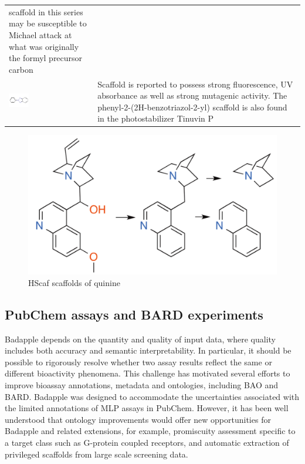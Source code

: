 \begin{table}
\begin{tabular}{p{0.3\linewidth}p{0.7\linewidth}}
scaffold in this series may be susceptible to Michael attack at what was originally the formyl precursor carbon\\
\includegraphics[align=t,width=0.25\textwidth]{data/badapple/medchem_05.png} & Scaffold is reported to possess strong fluorescence, UV absorbance as well as strong mutagenic activity\cite{Oda2008-at}. The phenyl-2-(2H-benzotriazol-2-yl) scaffold is also found in the photostabilizer Tinuvin P\\
\hline
\end{tabular}
\label{table:ba_cmp_medchem}
\end{table}

\begin{figure}
	\includegraphics[width=\textwidth]{figures/badapple/Badapple_Fig5.png}
	\caption{HScaf scaffolds of quinine}
	\label{fig:BA_05}
\end{figure}

\subsection{PubChem assays and BARD experiments}

Badapple depends on the quantity and quality of input data, where quality includes both accuracy and semantic interpretability. In particular, it should be possible to rigorously resolve whether two assay results reflect the same or different bioactivity phenomena. This challenge has motivated several efforts to improve bioassay annotations, metadata and ontologies, including BAO and BARD. Badapple was designed to accommodate the uncertainties associated with the limited annotations of MLP assays in PubChem. However, it has been well understood that ontology improvements would offer new opportunities for Badapple and related extensions, for example, promiscuity assessment specific to a target class such as G-protein coupled receptors, and automatic extraction of privileged scaffolds from large scale screening data.

